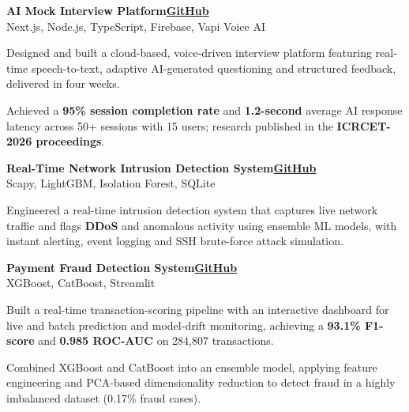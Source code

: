 \documentclass[10pt,a4paper]{article}
\newcommand{\entry}[2]{\textbf{#1}\hfill\textbf{#2}\\}
\newcommand{\sub}[2]{#1\hfill#2\par}
\newenvironment{points}{\vspace{0.3ex}\begin{list}{\color{theme}\textbullet}{\setlength{\leftmargin}{1.1em}\setlength{\itemsep}{0.15ex}\setlength{\parsep}{0pt}\setlength{\topsep}{0pt}}}{\end{list}\vspace{0.4ex}}
\begin{document}
\entry{AI Mock Interview Platform}{\href{https://github.com/Vishwanathanirv/ai_mock_interviews}{\color{theme}GitHub}}
\sub{Next.js, Node.js, TypeScript, Firebase, Vapi Voice AI}{}
\begin{points}
  \item Designed and built a cloud-based, voice-driven interview platform featuring real-time speech-to-text, adaptive AI-generated questioning and structured feedback, delivered in four weeks.
  \item Achieved a \textbf{95\% session completion rate} and \textbf{1.2-second} average AI response latency across 50+ sessions with 15 users; research published in the \textbf{ICRCET-2026 proceedings}.
\end{points}

\entry{Real-Time Network Intrusion Detection System}{\href{https://github.com/Vishwanathanirv/Real-time-Intrusion-Detection-System-main}{\color{theme}GitHub}}
\sub{Scapy, LightGBM, Isolation Forest, SQLite}{}
\begin{points}
  \item Engineered a real-time intrusion detection system that captures live network traffic and flags \textbf{DDoS} and anomalous activity using ensemble ML models, with instant alerting, event logging and SSH brute-force attack simulation.
\end{points}

\entry{Payment Fraud Detection System}{\href{https://github.com/Vishwanathanirv/Online-payment-fraud-detection}{\color{theme}GitHub}}
\sub{XGBoost, CatBoost, Streamlit}{}
\begin{points}
  \item Built a real-time transaction-scoring pipeline with an interactive dashboard for live and batch prediction and model-drift monitoring, achieving a \textbf{93.1\% F1-score} and \textbf{0.985 ROC-AUC} on 284,807 transactions.
  \item Combined XGBoost and CatBoost into an ensemble model, applying feature engineering and PCA-based dimensionality reduction to detect fraud in a highly imbalanced dataset (0.17\% fraud cases).
\end{points}
\end{document}
